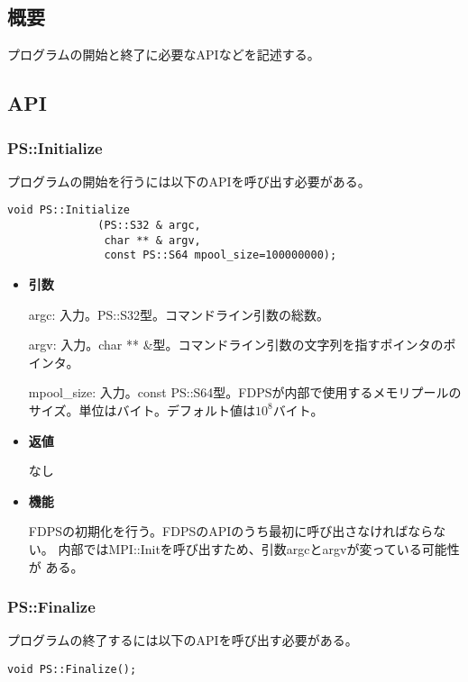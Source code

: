 \subsection{概要}

プログラムの開始と終了に必要なAPIなどを記述する。

\subsection{API}

\subsubsection{PS::Initialize}

プログラムの開始を行うには以下のAPIを呼び出す必要がある。
\begin{screen}
\begin{verbatim}
void PS::Initialize
              (PS::S32 & argc,
               char ** & argv,
               const PS::S64 mpool_size=100000000);
\end{verbatim}
\end{screen}

\begin{itemize}

\item {\bf 引数}

argc: 入力。PS::S32型。コマンドライン引数の総数。

argv: 入力。char ** \&型。コマンドライン引数の文字列を指すポインタのポ
インタ。

mpool\_size: 入力。const PS::S64型。FDPSが内部で使用するメモリプールのサイズ。単位はバイト。デフォルト値は$10^{8}$バイト。

\item {\bf 返値}

  なし

\item {\bf 機能}

  FDPSの初期化を行う。FDPSのAPIのうち最初に呼び出さなければならない。
  内部ではMPI::Initを呼び出すため、引数argcとargvが変っている可能性が
  ある。

\end{itemize}

\subsubsection{PS::Finalize}

プログラムの終了するには以下のAPIを呼び出す必要がある。
\begin{screen}
\begin{verbatim}
void PS::Finalize();
\end{verbatim}
\end{screen}

